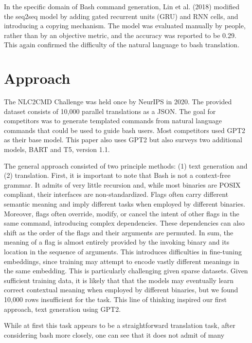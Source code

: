 \documentclass{article}
\begin{document}
In the specific domain of Bash command generation, Lin et al. (2018)
\cite{lin2018nl2bash} modified the seq2seq model by adding gated recurrent
units (GRU) and RNN cells, and introducing a copying mechanism. The model was
evaluated manually by people, rather than by an objective metric, and the
accuracy was reported to be 0.29. This again confirmed the difficulty of the
natural language to bash translation.


\section{Approach}
The NLC2CMD Challenge was held once by NeurIPS in 2020. The provided dataset
consists of 10,000 parallel translations as a JSON. The goal for competitors
was to generate templated commands from natural language commands that could be
used to guide bash users. Most competitors used GPT2 as their base model. This
paper also uses GPT2 but also surveys two additional models, BART and T5,
version 1.1.
\par
The general approach consisted of two principle methods: (1) text generation
and (2) translation. First, it is important to note that Bash is not a
context-free grammar. It admits of very little recursion and, while most
binaries are POSIX compliant, their interfaces are non-standardized. Flags
often carry different semantic meaning and imply different tasks when employed
by different binaries. Moreover, flags often override, modify, or cancel the
intent of other flags in the same command, introducing complex dependencies.
These dependencies can also shift as the order of the flags and their arguments
are permuted. In sum, the meaning of a flag is almost entirely provided by the
invoking binary and its location in the sequence of arguments. This introduces
difficulties in fine-tuning embeddings, since training may attempt to encode
vastly different meanings in the same embedding. This is particularly
challenging given sparse datasets. Given sufficient training data, it is likely
that that the models may eventually learn correct contextual meaning when
employed by different binaries, but we found 10,000 rows insufficient for the
task. This line of thinking inspired our first approach, text generation using
GPT2.
\par
While at first this task appears to be a straightforward translation task,
after considering bash more closely, one can see that it does not admit of many
\end{document}
